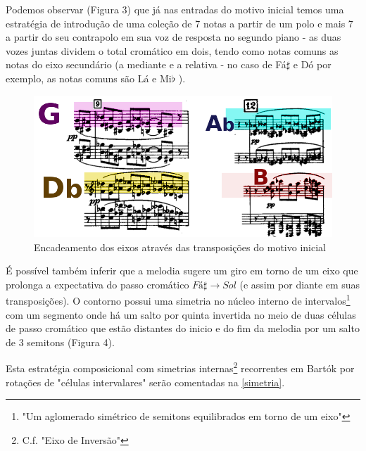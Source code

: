 \documentclass[
	12pt,				%
	openright,			%
	twoside,			%
	a4paper,			%
	english,			%
	french,				%
	spanish,			%
	brazil				%
	]{abntex2}
\begin{document}
Podemos observar (Figura 3) que já nas entradas do motivo inicial temos uma estratégia de introdução de uma coleção de 7 notas a partir de um polo e mais 7 a partir do seu contrapolo em sua voz de resposta no segundo piano - as duas vozes juntas dividem o total cromático em dois, tendo como notas comuns as notas do eixo secundário (a mediante e a relativa - no caso de Fá$\sharp$ e Dó por exemplo, as notas comuns são Lá e Mi$\flat$ ).

\begin{figure}[!h]
	\caption{\label{fig_grafico}Encadeamento dos eixos através das transposições do motivo inicial }
	\begin{center}
	    \includegraphics[scale=0.35]{axis/sonata2pianos_mm9-12.png}
	\end{center}
\end{figure}



É possível também inferir que a melodia sugere um giro em torno de um eixo que prolonga a expectativa do passo cromático $Fá\sharp \rightarrow Sol$ (e assim por diante em suas transposições). O contorno possui uma simetria no núcleo interno de intervalos\footnote{"Um aglomerado simétrico de semitons equilibrados em torno de um eixo"\cite[ p.120]{straus2004}} com um segmento onde há um salto por quinta invertida no meio de duas células de passo cromático que estão distantes do inicio e do fim da melodia por um salto de 3 semitons (Figura 4). 

Esta estratégia composicional com simetrias internas\footnote{C.f. "Eixo de Inversão"\cite[ p.121]{straus2004}} recorrentes em Bartók por rotações de "células intervalares"\cite[ p.128]{susanni_antokoletz2012music} serão comentadas na \autoref{simetria}.
\end{document}
